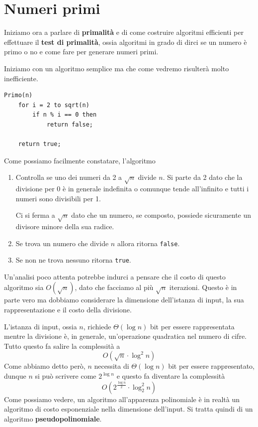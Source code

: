 \chapter{Numeri primi}\label{primi}

Iniziamo ora a parlare di \textbf{primalit\`a} e di come costruire algoritmi
efficienti per effettuare il \textbf{test di primalit\`a}, ossia algoritmi in
grado di dirci se un numero \`e primo o no e come fare per generare numeri
primi.

Iniziamo con un algoritmo semplice ma che come vedremo risulter\`a molto inefficiente.
\begin{lstlisting}
Primo(n)
	for i = 2 to sqrt(n)
		if n % i == 0 then
			return false;
	
	return true;
\end{lstlisting}
Come possiamo facilmente constatare, l'algoritmo
\begin{enumerate}
	\item Controlla se uno dei numeri da 2 a $\sqrt{n}$ divide $n$. Si parte da 2 dato che la divisione per 0 \`e in
	      generale indefinita o comunque tende all'infinito e tutti i numeri sono divisibili per 1.

	      Ci si ferma a $\sqrt{n}$ dato che un numero, se composto, possiede sicuramente un divisore minore della sua
	      radice.
	\item Se trova un numero che divide $n$ allora ritorna \verb|false|.
	\item Se non ne trova nessuno ritorna \verb|true|.
\end{enumerate}
Un'analisi poco attenta potrebbe indurci a pensare che il costo di questo algoritmo sia $O(\sqrt{n})$, dato che
facciamo al pi\`u $\sqrt{n}$ iterazioni. Questo \`e in parte vero ma dobbiamo considerare la dimensione dell'istanza
di input, la sua rappresentazione e il costo della divisione.

L'istanza di input, ossia $n$, richiede $\Theta(\log n)$ bit per essere rappresentata mentre la divisione \`e, in
generale, un'operazione quadratica nel numero di cifre. Tutto questo fa salire la complessit\`a a
\[ O(\sqrt{n} \cdot \log^2 n) \]
Come abbiamo detto per\`o, $n$ necessita di $\Theta(\log n)$ bit per essere rappresentato, dunque $n$
si pu\`o scrivere come $2^{\log n}$ e questo fa diventare la complessit\`a
\[ O(2^\frac{\log n}{2} \cdot \log^2_2 n) \]
Come possiamo vedere, un algoritmo all'apparenza polinomiale \`e in realt\`a un algoritmo di costo esponenziale nella
dimensione dell'input. Si tratta quindi di un algoritmo \textbf{pseudopolinomiale}.

